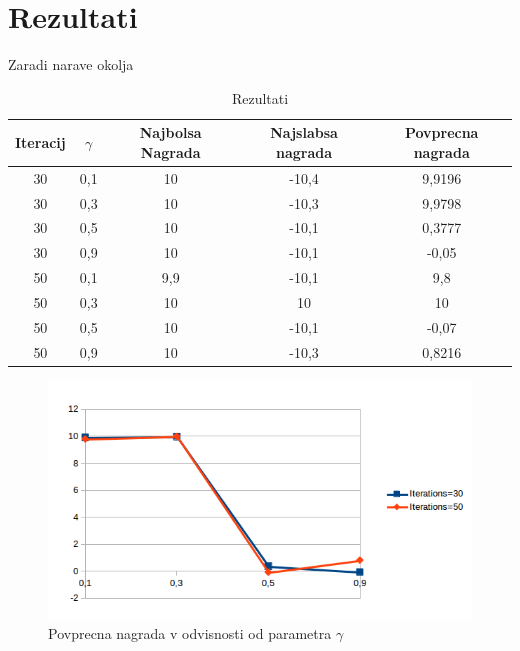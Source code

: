 \documentclass[a4paper]{article}
\begin{document}
\section{Rezultati}

Zaradi narave okolja 

\begin{table}[h!]
  \begin{tabular}{|c|c|c|c|c|}
  \hline
  Iteracij & $\gamma$ & Najbolsa Nagrada & Najslabsa nagrada & Povprecna nagrada \\\hline
  30         & 0,1   & 10          & -10,4        & 9,9196         \\
  30         & 0,3   & 10          & -10,3        & 9,9798         \\
  30         & 0,5   & 10          & -10,1        & 0,3777         \\
  30         & 0,9   & 10          & -10,1        & -0,05          \\\hline
  50         & 0,1   & 9,9         & -10,1        & 9,8            \\
  50         & 0,3   & 10          & 10           & 10             \\
  50         & 0,5   & 10          & -10,1        & -0,07          \\
  50         & 0,9   & 10          & -10,3        & 0,8216        \\\hline
  \end{tabular}
  \caption{Rezultati}
\end{table}
\begin{figure}[h!]
  \centering
  \includegraphics[width=1.0\textwidth]{graf.png}
  \caption{Povprecna nagrada v odvisnosti od parametra $\gamma$}
\end{figure}
\end{document}
